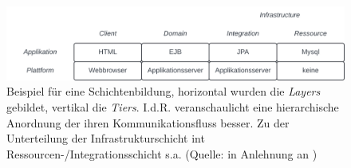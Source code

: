 \begin{figure}
    \centering
    \includegraphics[scale=0.4]{part two/Objektorientierte Analyse/img/layerstiers}
    \caption{Beispiel für eine Schichtenbildung, horizontal wurden die \textit{Layers} gebildet, vertikal die \textit{Tiers}. I.d.R. veranschaulicht eine hierarchische Anordnung der  ihren Kommunikationsfluss besser. Zu der Unterteilung der Infrastrukturschicht int Ressourcen-/Integrationsschicht s.a. \cite[144]{Sta14g} (Quelle: in Anlehnung an \cite[42]{Wed09b})}
    \label{fig:layerstiers}
\end{figure}
